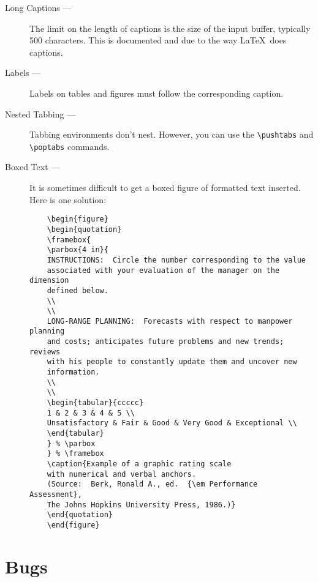 \begin{description}

\item[Long Captions --- ]
The limit on the length of captions is the size of the input
buffer, typically 500 characters. This is documented and due to the way
\LaTeX\ does captions.

\item[Labels --- ]
Labels on tables and figures must follow the corresponding caption.

\item[Nested Tabbing --- ]
\sloppy
Tabbing environments don't nest.
However, you can use the \verb|\pushtabs| and \verb|\poptabs| commands.

\item[Boxed Text ---]
It is sometimes difficult to get a boxed figure of formatted text inserted.
Here is one solution:
\begin{verbatim}
    \begin{figure}
    \begin{quotation}
    \framebox{
    \parbox{4 in}{
    INSTRUCTIONS:  Circle the number corresponding to the value
    associated with your evaluation of the manager on the dimension
    defined below.
    \\
    \\
    LONG-RANGE PLANNING:  Forecasts with respect to manpower planning
    and costs; anticipates future problems and new trends; reviews
    with his people to constantly update them and uncover new
    information.
    \\
    \\
    \begin{tabular}{ccccc}
    1 & 2 & 3 & 4 & 5 \\
    Unsatisfactory & Fair & Good & Very Good & Exceptional \\
    \end{tabular}
    } % \parbox
    } % \framebox
    \caption{Example of a graphic rating scale
    with numerical and verbal anchors.
    (Source:  Berk, Ronald A., ed.  {\em Performance Assessment},
    The Johns Hopkins University Press, 1986.)}
    \end{quotation}
    \end{figure}
\end{verbatim}

\end{description}

\section{Bugs}

